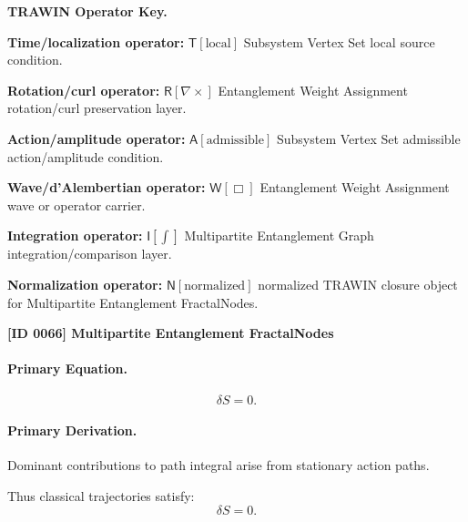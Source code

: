 \par\vspace{0.45\baselineskip}
\noindent\begin{minipage}[t]{\linewidth}
\begingroup
\small
\raggedright
\textbf{TRAWIN Operator Key.}\par
\noindent\textbf{Time/localization operator:} $\mathsf{T}\!\left[\mathrm{local}\right]$ Subsystem Vertex Set local source condition.\par
\noindent\textbf{Rotation/curl operator:} $\mathsf{R}\!\left[\nabla\times\right]$ Entanglement Weight Assignment rotation/curl preservation layer.\par
\noindent\textbf{Action/amplitude operator:} $\mathsf{A}\!\left[\mathrm{admissible}\right]$ Subsystem Vertex Set admissible action/amplitude condition.\par
\noindent\textbf{Wave/d'Alembertian operator:} $\mathsf{W}\!\left[\Box\right]$ Entanglement Weight Assignment wave or operator carrier.\par
\noindent\textbf{Integration operator:} $\mathsf{I}\!\left[\int\right]$ Multipartite Entanglement Graph integration/comparison layer.\par
\noindent\textbf{Normalization operator:} $\mathsf{N}\!\left[\mathrm{normalized}\right]$ normalized TRAWIN closure object for Multipartite Entanglement FractalNodes.\par
\endgroup
\end{minipage}

\clearpage
\noindent\textbf{[ID 0066] Multipartite Entanglement FractalNodes}\par
\vspace{0.35em}
\paragraph{Primary Equation.}
\begin{equation}
\delta S = 0.
\end{equation}

\paragraph{Primary Derivation.}
Dominant contributions to path integral arise from stationary action paths.

Thus classical trajectories satisfy:
\begin{equation}
\boxed{\delta S = 0.}
\end{equation}

